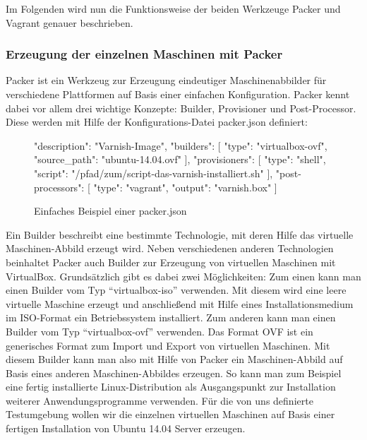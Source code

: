 Im Folgenden wird nun die Funktionsweise der beiden Werkzeuge Packer und Vagrant genauer beschrieben.

\subsubsection{Erzeugung der einzelnen Maschinen mit Packer}

Packer ist ein Werkzeug zur Erzeugung eindeutiger Maschinenabbilder für verschiedene Plattformen auf Basis einer einfachen Konfiguration. Packer kennt dabei vor allem drei wichtige Konzepte: Builder, Provisioner und Post-Processor. Diese werden mit Hilfe der Konfigurations-Datei packer.json definiert:

\begin{figure}[!ht]
  \begin{center}
    \begin{jsoncode}
{
    "description": "Varnish-Image",
    "builders": [
        {
            "type": "virtualbox-ovf",
            "source_path": "ubuntu-14.04.ovf"
        }
    ],
    "provisioners": [
        {
            "type": "shell",
            "script": "/pfad/zum/script-das-varnish-installiert.sh"
        }
    ],
    "post-processors": [
        {
            "type": "vagrant",
            "output": "varnish.box"
        }
    ]
}
    \end{jsoncode}
    \caption{Einfaches Beispiel einer packer.json}
  \end{center}
\end{figure}

Ein Builder beschreibt eine bestimmte Technologie, mit deren Hilfe das virtuelle Maschinen-Abbild erzeugt wird. Neben verschiedenen anderen Technologien beinhaltet Packer auch Builder zur Erzeugung von virtuellen Maschinen mit VirtualBox. Grundsätzlich gibt es dabei zwei Möglichkeiten: Zum einen kann man einen Builder vom Typ "`virtualbox-iso"' verwenden. Mit diesem wird eine leere virtuelle Maschine erzeugt und anschließend mit Hilfe eines Installationsmedium im ISO-Format ein Betriebssystem installiert. Zum anderen kann man einen Builder vom Typ "`virtualbox-ovf"' verwenden. Das Format OVF ist ein generisches Format zum Import und Export von virtuellen Maschinen. Mit diesem Builder kann man also mit Hilfe von Packer ein Maschinen-Abbild auf Basis eines anderen Maschinen-Abbildes erzeugen. So kann man zum Beispiel eine fertig installierte Linux-Distribution als Ausgangspunkt zur Installation weiterer Anwendungsprogramme verwenden. Für die von uns definierte Testumgebung wollen wir die einzelnen virtuellen Maschinen auf Basis einer fertigen Installation von Ubuntu 14.04 Server erzeugen.

